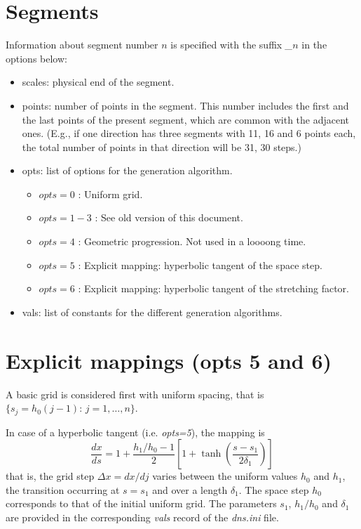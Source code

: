 \section{Segments}
Information about segment number $n$ is specified with the suffix {\it \_$n$} in
the options below:
\begin{itemize}
\item scales: physical end of the segment. 
\item points: number of points in the segment. This number includes the first
  and the last points of the present segment, which are common with the adjacent
  ones. (E.g., if one direction has three segments with 11, 16 and 6 points
  each, the total number of points in that direction will be 31, 30 steps.)
\item opts: list of options for the generation algorithm.
\begin{itemize}
\item $opts=0$ : Uniform grid.
\item $opts=1-3$ : See old version of this document. 
\item $opts=4$ : Geometric progression. Not used in a loooong time.
\item $opts=5$ : Explicit mapping: hyperbolic tangent of the space step.
\item $opts=6$ : Explicit mapping: hyperbolic tangent of the stretching factor.
\end{itemize}                                                   

\item vals: list of constants for the different generation algorithms.
\end{itemize}

\section{Explicit mappings (opts 5 and 6)}
A basic grid is considered first with uniform spacing, that is
$\{s_j=h_0(j-1):\, j = 1,\ldots,n\}$. 

In case of a hyperbolic tangent (i.e. {\it opts=5}), the mapping is
\begin{equation}
\frac{dx}{ds} = 1 + \frac{h_1/h_0-1}{2}\left[ 1 + \tanh\left(\frac{s-s_1}{2\delta_1}\right)\right]
\end{equation}
that is, the grid step $\Delta x =dx/dj$ varies between the uniform values $h_0$
and $h_1$, the transition occurring at $s=s_1$ and over a length $\delta_1$. The
space step $h_0$ corresponds to that of the initial uniform grid. The parameters
$s_1$, $h_1/h_0$ and $\delta_1$ are provided in the corresponding {\it vals}
record of the {\it dns.ini} file.

